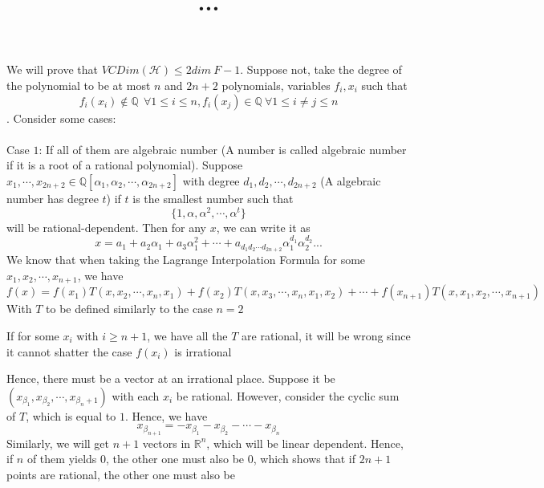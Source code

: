 \documentclass[english, 10pt]{article} %
\title{...}
\begin{document}
\maketitle
We will prove that $VCDim(\mathcal{H}) \leq 2dim \ F-1$. Suppose not, take the degree of the polynomial to be at most $n$ and $2n+2$ polynomials, variables $f_i,x_i$ such that
$$f_i(x_i) \not \in \mathbb{Q} \ \ \forall 1 \leq i \leq n, f_i(x_j) \in \mathbb{Q} \ \forall 1 \leq i \neq j \leq n$$. Consider some cases:\\
\\
Case $1$: If all of them are algebraic number (A number is called algebraic number if it is a root of a rational polynomial). Suppose $x_1,\cdots,x_{2n+2} \in \mathbb{Q} [\alpha_1,\alpha_2,\cdots,\alpha_{2n+2}]$ with degree $d_1,d_2,\cdots,d_{2n+2}$ (A algebraic number has degree $t$) if $t$ is the smallest number such that
$$\{1,\alpha,\alpha^2,\cdots,\alpha^t\}$$
will be rational-dependent. Then for any $x$, we can write it as
$$x=a_1+a_2\alpha_1+a_3\alpha_1^2+\cdots+a_{d_1d_2\cdots d_{2n+2}}\alpha_1^{d_1}\alpha_2^{d_2}...
$$
We know that when taking the Lagrange Interpolation Formula for some $x_1,x_2,\cdots,x_{n+1}$, we have
$$f(x) = f(x_1)T(x,x_2,\cdots,x_n,x_1)+f(x_2)T(x,x_3,\cdots,x_n,x_1,x_2)+\cdots+f(x_{n+1})T(x,x_1,x_2,\cdots,x_{n+1})$$
With $T$ to be defined similarly to the case $n=2$

If for some $x_{i}$ with $i \geq n+1$, we have all the $T$ are rational, it will be wrong since it cannot shatter the case $f(x_i)$ is irrational

Hence, there must be a vector at an irrational place. Suppose it be $(x_{\beta_1},x_{\beta_2},\cdots,x_{\beta_n+1})$ with each $x_i$ be rational. However, consider the cyclic sum of $T$, which is equal to $1$. Hence, we have
$$x_{\beta_{n+1}}=-x_{\beta_1}-x_{\beta_2}-\cdots-x_{\beta_{n}}$$
Similarly, we will get $n+1$ vectors in $\mathbb{R}^n$, which will be linear dependent. Hence, if $n$ of them yields $0$, the other one must also be $0$, which shows that if $2n+1$ points are rational, the other one must also be
\end{document}
